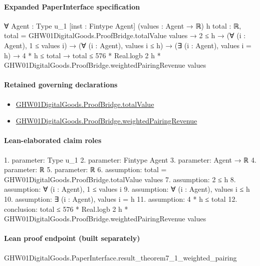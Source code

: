 \documentclass[10pt]{article}
\begin{document}
\paragraph{Expanded PaperInterface specification}
\begin{ReviewVerbatim}
∀ {Agent : Type u_1} [inst : Fintype Agent] (values : Agent → ℝ) {h total : ℝ},
  total = GHW01DigitalGoods.ProofBridge.totalValue values →
    2 ≤ h →
      (∀ (i : Agent), 1 ≤ values i) →
        (∀ (i : Agent), values i ≤ h) →
          (∃ (i : Agent), values i = h) →
            4 * h ≤ total → total ≤ 576 * Real.logb 2 h * GHW01DigitalGoods.ProofBridge.weightedPairingRevenue values
\end{ReviewVerbatim}

\paragraph{Retained governing declarations}
\begin{itemize}\raggedright
\item \hyperlink{paper-prerequisite-1dad2de1fe153716}{GHW01\allowbreak{}Digital\allowbreak{}Goods.\allowbreak{}Proof\allowbreak{}Bridge.\allowbreak{}total\allowbreak{}Value}
\item \hyperlink{governing-declaration-e373ea90f301fd9e}{GHW01\allowbreak{}Digital\allowbreak{}Goods.\allowbreak{}Proof\allowbreak{}Bridge.\allowbreak{}weighted\allowbreak{}Pairing\allowbreak{}Revenue}
\end{itemize}
\paragraph{Lean-elaborated claim roles}\begin{ReviewVerbatim}
1. parameter: Type u_1
2. parameter: Fintype Agent
3. parameter: Agent → ℝ
4. parameter: ℝ
5. parameter: ℝ
6. assumption: total = GHW01DigitalGoods.ProofBridge.totalValue values
7. assumption: 2 ≤ h
8. assumption: ∀ (i : Agent), 1 ≤ values i
9. assumption: ∀ (i : Agent), values i ≤ h
10. assumption: ∃ (i : Agent), values i = h
11. assumption: 4 * h ≤ total
12. conclusion: total ≤ 576 * Real.logb 2 h * GHW01DigitalGoods.ProofBridge.weightedPairingRevenue values
\end{ReviewVerbatim}

\paragraph{Lean proof endpoint (built separately)}\begin{ReviewVerbatim}
GHW01DigitalGoods.PaperInterface.result_theorem7_1_weighted_pairing
\end{ReviewVerbatim}
\end{document}
